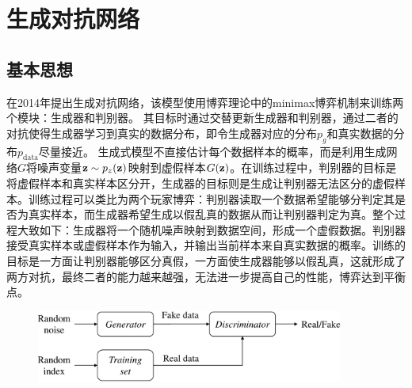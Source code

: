 

\section{生成对抗网络}
\subsection{基本思想}
\citet{goodfellow2014generative}在2014年提出生成对抗网络，该模型使用博弈理论中的minimax博弈机制来训练两个模块：生成器和判别器。
其目标时通过交替更新生成器和判别器，通过二者的对抗使得生成器学习到真实的数据分布，即令生成器对应的分布$p_g$和真实数据的分布$p_{\text{data}}$尽量接近。
生成式模型不直接估计每个数据样本的概率，而是利用生成网络$G$将噪声变量$\mathbf{z} \sim p_z(\mathbf{z})$映射到虚假样本$G(\mathbf{z})$。在训练过程中，判别器的目标是将虚假样本和真实样本区分开，生成器的目标则是生成让判别器无法区分的虚假样本。训练过程可以类比为两个玩家博弈：判别器读取一个数据希望能够分判定其是否为真实样本，而生成器希望生成以假乱真的数据从而让判别器判定为真。整个过程大致如下：生成器将一个随机噪声映射到数据空间，形成一个虚假数据。判别器接受真实样本或虚假样本作为输入，并输出当前样本来自真实数据的概率。训练的目标是一方面让判别器能够区分真假，一方面使生成器能够以假乱真，这就形成了两方对抗，最终二者的能力越来越强，无法进一步提高自己的性能，博弈达到平衡点。
\begin{figure}[htbp]
  \centering
  \includegraphics[width=0.9\textwidth]{Img/arch-gan.pdf}
  \label{fig:arch-gan}
\end{figure}

